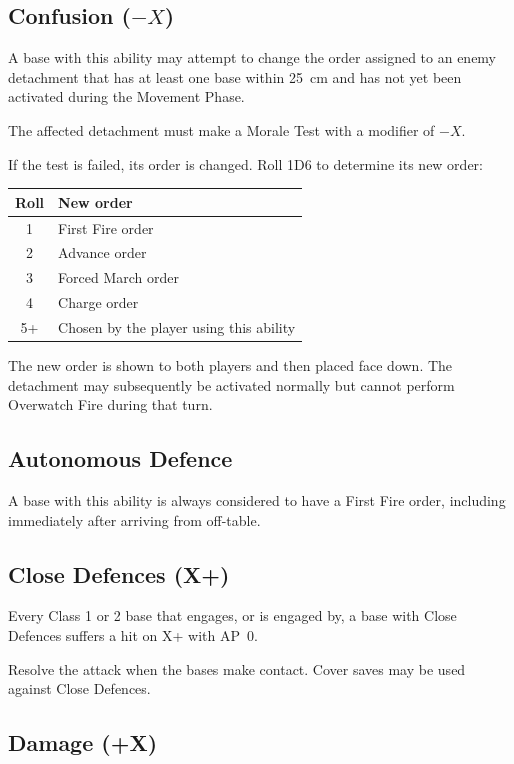 \subsection{Confusion ($-X$)}

A base with this ability may attempt to change the order assigned to an enemy detachment that has at least one base within 25~cm and has not yet been activated during the Movement Phase.

The affected detachment must make a Morale Test with a modifier of $-X$.

If the test is failed, its order is changed. Roll 1D6 to determine its new order:

\begin{center}
    \begin{tabular}{c l}
        \textbf{Roll} & \textbf{New order} \\
        \hline
        1  & First Fire order \\
        2  & Advance order \\
        3  & Forced March order \\
        4  & Charge order \\
        5+ & Chosen by the player using this ability
    \end{tabular}
\end{center}

The new order is shown to both players and then placed face down. The detachment may subsequently be activated normally but cannot perform Overwatch Fire during that turn.

\subsection{Autonomous Defence}

A base with this ability is always considered to have a First Fire order, including immediately after arriving from off-table.

\subsection{Close Defences (X+)}

Every Class 1 or 2 base that engages, or is engaged by, a base with Close Defences suffers a hit on X+ with AP~0.

Resolve the attack when the bases make contact. Cover saves may be used against Close Defences.

\subsection{Damage (+X)}

